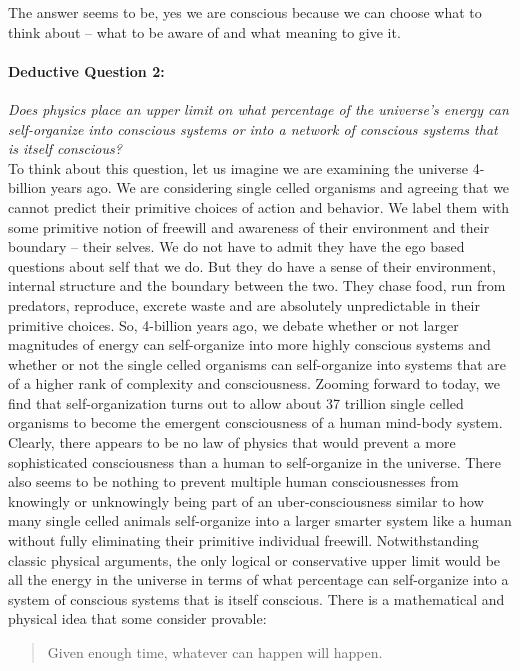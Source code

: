 \documentclass[submission,copyright,creativecommons]{eptcs}
\begin{document}
The answer seems to be, yes we are conscious because we can choose what to think about --
what to be aware of and what meaning to give it.
\paragraph{\textbf{Deductive Question 2:}}

\textit{Does physics place an upper limit on what percentage of the universe’s energy can self-organize into conscious systems or into a network of conscious systems that is itself conscious?}\\

To think about this question, let us imagine we are examining the universe 4-billion years ago. We are considering single celled organisms and agreeing that we cannot predict their primitive choices of action and behavior. We label them with some primitive notion of freewill and awareness of their environment and their boundary --
their selves. We do not have to admit they have the ego based questions about self that we do. But they do have a sense of their environment, internal structure and the boundary between the two. They chase food, run from predators, reproduce, excrete waste and are absolutely unpredictable in their primitive choices. So, 4-billion years ago, we debate whether or not larger magnitudes of energy can self-organize into more highly conscious systems and whether or not the single celled organisms can self-organize into systems that are of a higher rank of complexity and consciousness. Zooming forward to today, we find that self-organization turns out to allow about 37 trillion single celled organisms to become the emergent consciousness of a human mind-body system. Clearly, there appears to be no law of physics that would prevent a more sophisticated consciousness than a human to self-organize in the universe. There also seems to be nothing to prevent multiple human consciousnesses from knowingly or unknowingly being part of an uber-consciousness similar to how many single celled animals self-organize into a larger smarter system like a human without fully eliminating their primitive individual freewill. Notwithstanding classic physical arguments, the only logical or conservative upper limit would be all the energy in the universe in terms of what percentage can self-organize into a system of conscious systems that is itself conscious. There is a mathematical and physical idea that some consider provable:

\begin{quote}
Given enough time, whatever can happen will happen.
\source{}
\end{quote}
\end{document}
